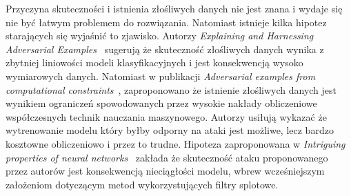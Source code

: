 \documentclass[
    left=2.5cm,         %
    right=2.5cm,        %
    top=2.5cm,          %
    bottom=3cm,         %
    bindingoffset=6mm,  %
    nohyphenation=false %
]{eiti/eiti-thesis}
\begin{document}
Przyczyna skuteczności i istnienia złośliwych danych nie jest znana i wydaje się nie być łatwym problemem do rozwiązania.
Natomiast istnieje kilka hipotez starających się wyjaśnić to zjawisko.
Autorzy \textit{Explaining and Harnessing Adversarial Examples}~\cite{harnessing} sugerują że skuteczność złośliwych danych wynika z zbytniej liniowości modeli klasyfikacyjnych
i jest konsekwencją wysoko wymiarowych danych.
Natomiast w publikacji \textit{Adversarial examples from computational constraints}~\cite{Bubeck2019AdversarialEF},
zaproponowano że istnienie złośliwych danych jest wynikiem ograniczeń spowodowanych przez wysokie nakłady obliczeniowe współczesnych technik nauczania maszynowego.
Autorzy usiłują wykazać że wytrenowanie modelu który byłby odporny na ataki jest możliwe, lecz bardzo kosztowne obliczeniowo i przez to trudne.
Hipoteza zaproponowana w \textit{Intriguing properties of neural networks}~\cite{DBLP:journals/corr/SzegedyZSBEGF13} zakłada
że skuteczność ataku proponowanego przez autorów jest konsekwencją nieciągłości modelu, wbrew wcześniejszym założeniom dotyczącym metod wykorzystujących filtry splotowe.

\newpage
\end{document}
